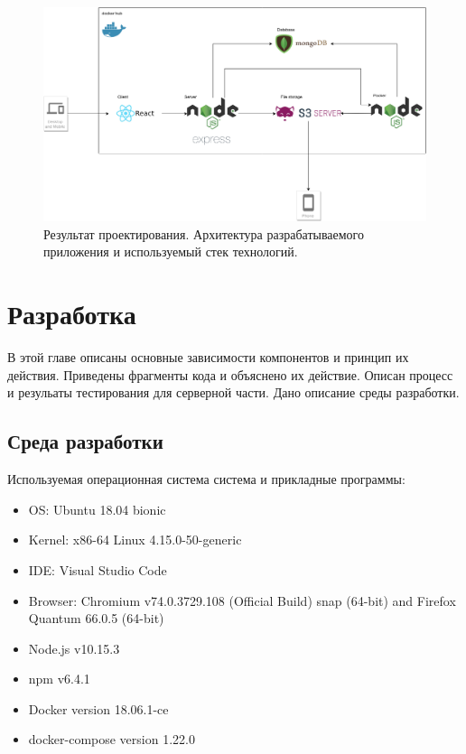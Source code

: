 \documentclass[%
  a5paper,
  subf,
  href,
  master,
  dotsinheaders 
]{csse-fcs}
\begin{document}
\begin{figure}[H]
\includegraphics[width=1\textwidth]{img/3.png}
\captionsetup{justification=justified}
\caption{Результат проектирования. Архитектура разрабатываемого приложения и используемый стек технологий. }
\label{architecture_stack}
\end{figure}

\chapter{Разработка}

В этой главе описаны основные зависимости компонентов и принцип их действия. Приведены фрагменты кода и объяснено их действие. Описан процесс и резульаты тестирования для серверной части. Дано описание среды разработки.

\section{Среда разработки}

Используемая операционная система система и прикладные программы:
 
\begin{itemize}
	\item OS: Ubuntu 18.04 bionic
	\item Kernel: x86-64 Linux 4.15.0-50-generic
	\item IDE: Visual Studio Code
	\item Browser: Chromium v74.0.3729.108 (Official Build) snap (64-bit) and Firefox Quantum 66.0.5 (64-bit)
	\item Node.js v10.15.3
	\item npm v6.4.1
	\item Docker version 18.06.1-ce
	\item docker-compose version 1.22.0
\end{itemize}
\end{document}
